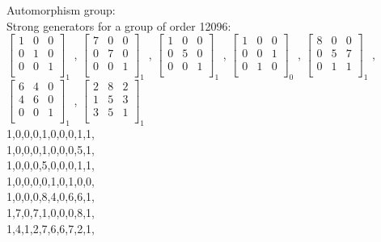 Automorphism group: \\
Strong generators for a group of order 12096:\\
$
\left[
\begin{array}{*{3}{r}}
1 & 0 & 0\\
0 & 1 & 0\\
0 & 0 & 1\\
\end{array}
\right]
_{1}
$
, 
$
\left[
\begin{array}{*{3}{r}}
7 & 0 & 0\\
0 & 7 & 0\\
0 & 0 & 1\\
\end{array}
\right]
_{1}
$
, 
$
\left[
\begin{array}{*{3}{r}}
1 & 0 & 0\\
0 & 5 & 0\\
0 & 0 & 1\\
\end{array}
\right]
_{1}
$
, 
$
\left[
\begin{array}{*{3}{r}}
1 & 0 & 0\\
0 & 0 & 1\\
0 & 1 & 0\\
\end{array}
\right]
_{0}
$
, 
$
\left[
\begin{array}{*{3}{r}}
8 & 0 & 0\\
0 & 5 & 7\\
0 & 1 & 1\\
\end{array}
\right]
_{1}
$
, 
$
\left[
\begin{array}{*{3}{r}}
6 & 4 & 0\\
4 & 6 & 0\\
0 & 0 & 1\\
\end{array}
\right]
_{1}
$
, 
$
\left[
\begin{array}{*{3}{r}}
2 & 8 & 2\\
1 & 5 & 3\\
3 & 5 & 1\\
\end{array}
\right]
_{1}
$
\\
1,0,0,0,1,0,0,0,1,1,\\
1,0,0,0,1,0,0,0,5,1,\\
1,0,0,0,5,0,0,0,1,1,\\
1,0,0,0,0,1,0,1,0,0,\\
1,0,0,0,8,4,0,6,6,1,\\
1,7,0,7,1,0,0,0,8,1,\\
1,4,1,2,7,6,6,7,2,1,\\

